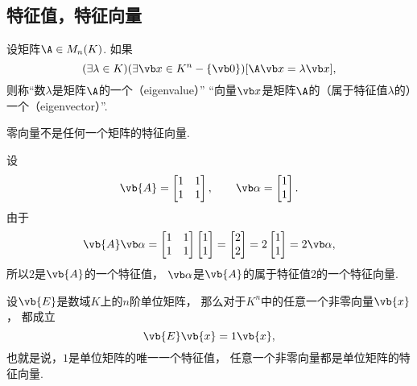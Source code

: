 \subsection{特征值，特征向量}
\begin{definition}
设矩阵\(\A \in M_n(K)\).
如果\[
	(\exists \lambda \in K)
	(\exists \x \in K^n - \{\vb0\})
	[\A\x = \lambda\x],
\]
则称“数\(\lambda\)是矩阵\(\A\)的一个（eigenvalue）”
“向量\(\x\)是矩阵\(\A\)的（属于特征值\(\lambda\)的）一个（eigenvector）”.
\end{definition}
\begin{remark}
零向量不是任何一个矩阵的特征向量.
\end{remark}
\begin{example}
设\[
	\vb{A} = \begin{bmatrix}
		1 & 1 \\ 1 & 1
	\end{bmatrix},
	\qquad
	\vb\alpha = \begin{bmatrix}
		1 \\ 1
	\end{bmatrix}.
\]
由于\[
	\vb{A} \vb\alpha
	= \begin{bmatrix}
		1 & 1 \\ 1 & 1
	\end{bmatrix}
	\begin{bmatrix}
		1 \\ 1
	\end{bmatrix}
	= \begin{bmatrix}
		2 \\ 2
	\end{bmatrix}
	= 2 \begin{bmatrix}
		1 \\ 1
	\end{bmatrix}
	= 2 \vb\alpha,
\]
所以\(2\)是\(\vb{A}\)的一个特征值，
\(\vb\alpha\)是\(\vb{A}\)的属于特征值\(2\)的一个特征向量.
\end{example}
\begin{example}
设\(\vb{E}\)是数域\(K\)上的\(n\)阶单位矩阵，
那么对于\(K^n\)中的任意一个非零向量\(\vb{x}\)，
都成立\[
	\vb{E} \vb{x} = 1 \vb{x},
\]
也就是说，\(1\)是单位矩阵的唯一一个特征值，
任意一个非零向量都是单位矩阵的特征向量.
\end{example}

